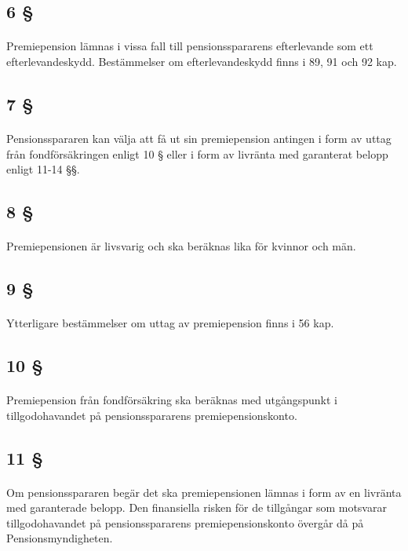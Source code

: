 \documentclass[a4paper,notitlepage,openany,10pt]{book}
\begin{document}
\subsection*{6 §}
\paragraph*{}
Premiepension lämnas i vissa fall till pensionsspararens efterlevande som ett efterlevandeskydd. Bestämmelser om efterlevandeskydd finns i 89, 91 och 92 kap.
\subsection*{7 §}
\paragraph*{}
Pensionsspararen kan välja att få ut sin premiepension antingen i form av uttag från fondförsäkringen enligt 10 § eller i form av livränta med garanterat belopp enligt 11-14 §§.
\subsection*{8 §}
\paragraph*{}
Premiepensionen är livsvarig och ska beräknas lika för kvinnor och män.
\subsection*{9 §}
\paragraph*{}
Ytterligare bestämmelser om uttag av premiepension finns i 56 kap.
\subsection*{10 §}
\paragraph*{}
Premiepension från fondförsäkring ska beräknas med utgångspunkt i tillgodohavandet på pensionsspararens premiepensionskonto.
\subsection*{11 §}
\paragraph*{}
Om pensionsspararen begär det ska premiepensionen lämnas i form av en livränta med garanterade belopp. Den finansiella risken för de tillgångar som motsvarar tillgodohavandet på pensionsspararens premiepensionskonto övergår då på Pensionsmyndigheten.
\end{document}
